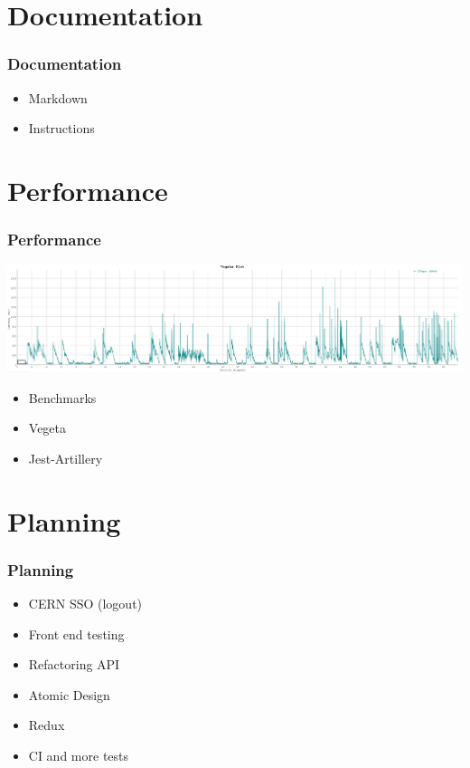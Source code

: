 \documentclass[12pt]{beamer}
\begin{document}
	\section{Documentation}
	\begin{frame}
		\frametitle{Documentation}
		\begin{itemize}
			\item Markdown
			\item Instructions
		\end{itemize}
	\end{frame}

	\section{Performance}
	\begin{frame}
		\frametitle{Performance}
		\includegraphics[scale=0.15]{assets/vegeta-plot.png}
		\begin{itemize}
			\item Benchmarks
			\item Vegeta
			\item Jest-Artillery
		\end{itemize}
	\end{frame}

	\section{Planning}
	\begin{frame}
		\frametitle{Planning}
		\begin{itemize}
			\item CERN SSO (logout)
			\item Front end testing
			\item Refactoring API
			\item Atomic Design
			\item Redux
			\item CI and more tests
		\end{itemize}
    \end{frame}
    


\end{document}
